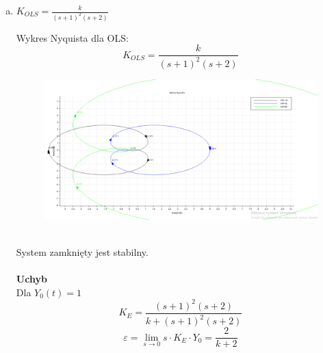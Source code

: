 \documentclass{article}
\begin{document}
\begin{enumerate}[a)]
\begin{enumerate}[a)]
        \newpage 
        
        \item $K_{OLS}=\frac{k}{\left(s + 1\right)^{2} \left(s + 2\right)}$
        
        
        Wykres Nyquista dla OLS:
        $$K_{OLS}=\frac{k}{\left(s + 1\right)^{2} \left(s + 2\right)}$$
        
        \begin{figure}
            \centering
            \includegraphics[width=12cm]{nq3.png}\
        \end{figure}
        
        System zamknięty jest stabilny.\\
        \\ \textbf{Uchyb}\\
        Dla $Y_0(t)=1$
        $$K_E=\frac{\left(s + 1\right)^{2} \left(s + 2\right)}{k + \left(s + 1\right)^{2} \left(s + 2\right)}$$
        $$\varepsilon=\lim_{s \rightarrow 0} {s\cdot K_E\cdot Y_0}=\frac{2}{k + 2}$$
    \end{enumerate}
\end{enumerate}
    \newpage
    
        
        
\end{document}
